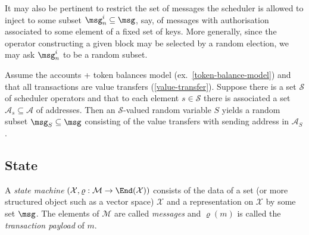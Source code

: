 \documentclass[a4paper,11pt]{article}
\begin{document}
It may also be pertinent to restrict the set of messages the scheduler is allowed to inject to some subset $\msg_n^i\subseteq\msg$, say, of messages with authorisation associated to some element of a fixed set of keys.
%
More generally, since the operator constructing a given block may be selected by a random election, we may ask $\msg_n^i$ to be a random subset.

\begin{example}

  Assume the accounts + token balances model (ex.~\ref{token-balance-model}) and that all transactions are value transfers (\ref{value-transfer}). Suppose there is a set $\mathcal{S}$ of scheduler operators and that to each element $s\in \mathcal{S}$ there is associated a set $\mathcal{A}_s\subseteq\mathcal{A}$ of addresses.
  Then an $\mathcal{S}$-valued random variable $S$ yields a random subset $\msg_S\subseteq \msg$ consisting of the value transfers with sending address in $\mathcal{A}_S$.
  
\end{example}

\begin{comment}
\begin{definition}[Realisability] \label{realizable-def}

  A \emph{timestamped block} is a tuple $(B,T)$ consisting of a (random) block $B\subseteq \msg$ and time $T>0$.
  A sequence $((B_1,T_1),\ldots,(B_N,T_N))$ of timestamped blocks is \emph{realisable} with respect to the sequence of injectable message sets $\{\msg^i_n\}_{n\in\N}$ if the condition 
  \[
    B_n \subset \bar{\msg}_n \cup \msg^i_n \quad \forall n\in[N]
  \]
  is satisfied almost surely. 

\end{definition}

\begin{remark}
  
  For any arrivals process $\msg^a$, any blockchain $((B_n,T_n))_{n\in\N}$ is realisable with respect to the injected messages of its own extended mempool process $\msg^i_n = \widetilde{\msg}_n\setminus\bar\msg_n$.
  
\end{remark}
\end{comment}

\subsection{State} 
A \emph{state machine} $(\mathcal{X},\varrho:\mathcal{M}\rightarrow\End(\mathcal{X}))$ consists of the data of a set (or more structured object such as a vector space) $\mathcal{X}$ and a representation on $\mathcal{X}$ by some set $\msg$. 
%
The elements of $\mathcal{M}$ are called \emph{messages} and $\varrho(m)$ is called the \emph{transaction payload} of $m$. 
\end{document}
